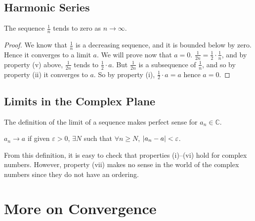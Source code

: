 \documentclass{article}
\begin{document}
\subsection{Harmonic Series}
\begin{lemma}
	The sequence $\frac{1}{n}$ tends to zero as $n \to \infty$.
\end{lemma}
\begin{proof}
	We know that $\frac{1}{n}$ is a decreasing sequence, and it is bounded below by zero. Hence it converges to a limit $a$. We will prove now that $a = 0$. $\frac{1}{2n} = \frac{1}{2}\cdot \frac{1}{n}$, and by property (v) above, $\frac{1}{2n}$ tends to $\frac{1}{2}\cdot a$. But $\frac{1}{2n}$ is a subsequence of $\frac{1}{n}$, and so by property (ii) it converges to $a$. So by property (i), $\frac{1}{2} \cdot a = a$ hence $a=0$.
\end{proof}

\subsection{Limits in the Complex Plane}
\begin{remark}
	The definition of the limit of a sequence makes perfect sense for $a_n \in \mathbb C$.
\end{remark}
\begin{definition}
	$a_n \to a$ if given $\varepsilon > 0$, $\exists N$ such that $\forall n \geq N$, $\abs{a_n - a} < \varepsilon$.
\end{definition}
From this definition, it is easy to check that properties (i)--(vi) hold for complex numbers. However, property (vii) makes no sense in the world of the complex numbers since they do not have an ordering.

\section{More on Convergence}
\end{document}
